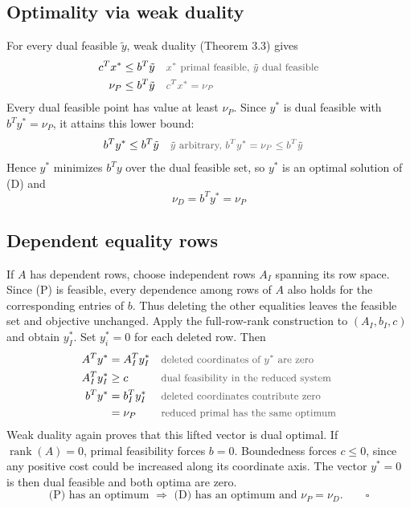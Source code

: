 \documentclass[a4paper,11pt]{article}
\newif\ifexplain
\newcommand{\teil}[1]{\subsection*{#1}}
\newcommand{\why}[1]{\text{\small\color{black!65}#1}}
\newcommand{\explain}[1]{\ifexplain\begin{erklbox}#1\end{erklbox}\fi}
\begin{document}
\teil{Optimality via weak duality}
For every dual feasible $\tilde y$, weak duality (Theorem 3.3) gives
\begin{align*}
c^Tx^* &\le b^T\tilde y && \why{$x^*$ primal feasible, $\tilde y$ dual feasible}\\
\nu_P &\le b^T\tilde y && \why{$c^Tx^* = \nu_P$}
\end{align*}
Every dual feasible point has value at least $\nu_P$. Since $y^*$ is dual feasible with $b^Ty^* = \nu_P$, it attains this lower bound:
\begin{align*}
b^Ty^* &\le b^T\tilde y && \why{$\tilde y$ arbitrary, $b^Ty^* = \nu_P \le b^T\tilde y$}
\end{align*}
Hence $y^*$ minimizes $b^Ty$ over the dual feasible set, so $y^*$ is an optimal solution of (D) and
\[
\boxed{\nu_D = b^Ty^* = \nu_P}
\]
\teil{Dependent equality rows}
If $A$ has dependent rows, choose independent rows $A_I$ spanning its row space. Since (P) is feasible, every dependence among rows of $A$ also holds for the corresponding entries of $b$. Thus deleting the other equalities leaves the feasible set and objective unchanged. Apply the full-row-rank construction to $(A_I,b_I,c)$ and obtain $y_I^*$. Set $y_i^*=0$ for each deleted row. Then
\begin{align*}
A^Ty^* &= A_I^Ty_I^* && \why{deleted coordinates of $y^*$ are zero}\\
A_I^Ty_I^* &\ge c && \why{dual feasibility in the reduced system}\\
b^Ty^* &= b_I^Ty_I^* && \why{deleted coordinates contribute zero}\\
&= \nu_P && \why{reduced primal has the same optimum}
\end{align*}
Weak duality again proves that this lifted vector is dual optimal. If $\operatorname{rank}(A)=0$, primal feasibility forces $b=0$. Boundedness forces $c\le0$, since any positive cost could be increased along its coordinate axis. The vector $y^*=0$ is then dual feasible and both optima are zero.
\[\boxed{\text{(P) has an optimum }\Longrightarrow\text{ (D) has an optimum and }\nu_P=\nu_D.}\qquad\square\]
\explain{Abhängige Gleichungen schränken die zulässigen Punkte nicht weiter ein. Wir entfernen sie für die Rechnung und setzen ihre dualen Variablen danach auf null. Dadurch bleiben sowohl $A^Ty$ als auch der duale Zielfunktionswert so, wie sie im reduzierten System waren.}
\explain{Der Schluss ist ein Sandwich: Schwache Dualität sagt $c^Tx\le b^Ty$ für jedes zulässige Paar. Weil das konstruierte $y^*$ den Wert exakt $b^Ty^*=\nu_P$ trifft, kann kein dualer Punkt darunter liegen, sonst würde er die schwache Dualität verletzen. Also ist $y^*$ dual optimal, und beide Optimalwerte stimmen überein.}
\explain{Warum reicht es laut Hinweis, die Zulässigkeit von (D) zu zeigen? Sobald $y^*$ dual zulässig ist und $b^Ty^*=\nu_P$ gilt, erledigt die schwache Dualität den Rest automatisch: Sie liefert $\nu_P\le b^Ty$ für alle dual zulässigen $y$ und damit die Optimalität von $y^*$. Die Existenz einer dualen Optimallösung folgt also nicht aus einer separaten Annahme, sondern aus der explizit hingeschriebenen Lösung $y^{*T}=c_B^TA_B^{-1}$.}
\end{document}
